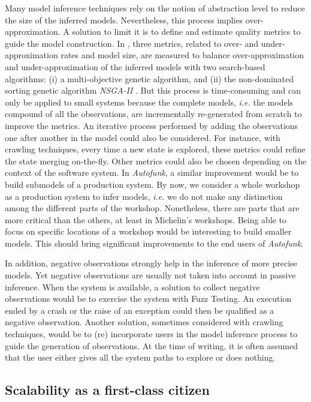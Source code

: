 Many model inference techniques rely on the notion of abstraction
level to reduce the size of the inferred models. Nevertheless,
this process implies over-approximation. A solution to limit it
is to define and estimate quality metrics
\cite{tonella2012finding,Lo20122063} to guide the model
construction. In \cite{tonella2012finding}, three metrics,
related to over- and under-approximation rates and model size,
are measured to balance over-approximation and
under-approximation of the inferred models with two search-based
algorithms: (i) a multi-objective genetic algorithm, and (ii) the
non-dominated sorting genetic algorithm \textit{NSGA-II}
\cite{deb2002fast}. But this process is time-consuming and can
only be applied to small systems because the complete models,
\emph{i.e.} the models compound of all the observations, are
incrementally re-generated from scratch to improve the metrics.
An iterative process performed by adding the observations one
after another in the model could also be considered. For
instance, with crawling techniques, every time a new state is
explored, these metrics could refine the state merging
on-the-fly. Other metrics could also be chosen depending on the
context of the software system. In \textit{Autofunk}, a similar
improvement would be to build submodels of a production system.
By now, we consider a whole workshop as a production system to
infer models, \emph{i.e.} we do not make any distinction among
the different parts of the workshop. Nonetheless, there are parts
that are more critical than the others, at least in Michelin's
workshops. Being able to focus on specific locations of a
workshop would be interesting to build smaller models. This
should bring significant improvements to the end users of
\textit{Autofunk}.

In addition, negative observations strongly help in the inference
of more precise models. Yet negative observations are usually not
taken into account in passive inference.  When the system is
available, a solution to collect negative observations would be
to exercise the system with Fuzz Testing.  An execution ended by
a crash or the raise of an exception could then be qualified as a
negative observation.  Another solution, sometimes considered
with crawling techniques, would be to (re) incorporate users in
the model inference process to guide the generation of
observations. At the time of writing, it is often assumed that
the user either gives all the system paths to explore or does
nothing.

\subsection{Scalability as a first-class citizen}

